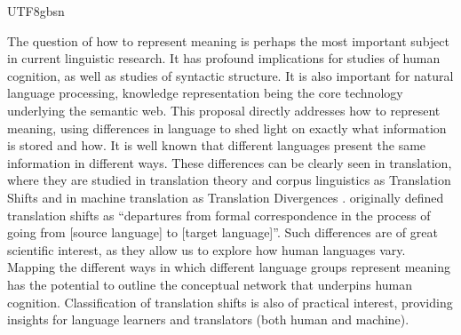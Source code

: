 \documentclass[12pt]{book} %
\begin{document}
\begin{CJK}{UTF8}{gbsn}

%
%

The question of how to represent meaning is perhaps the most important
subject in current linguistic research.  It has profound implications
for studies of human cognition, as well as studies of syntactic
structure.  It is also important for natural language processing,
knowledge representation being the core technology underlying the
semantic web.  This proposal directly addresses how to represent
meaning, using differences in language to shed light on exactly what
information is stored and how.
It is well known that different languages present the same information
in different ways.  These differences can be clearly seen in
translation, where they are studied in translation theory and corpus
linguistics as Translation Shifts
\citep{Bakker:Koster:Leuven-Zwart:2009,Pado:Erk:2010} and in
machine translation as Translation Divergences \citep{Dorr:1993}.
\citep[p.~73]{catford1965linguistic} originally defined translation
shifts as ``departures from formal correspondence in the process of
going from [source language] to [target language]''.  Such differences
are of great scientific interest, as they allow us to explore how
human languages vary.  Mapping the different ways in which different
language groups represent meaning has the potential to outline the
conceptual network that underpins human cognition.  Classification of
translation shifts is also of practical interest, providing insights
for language learners and translators (both human and machine).


\end{CJK}
\end{document}
